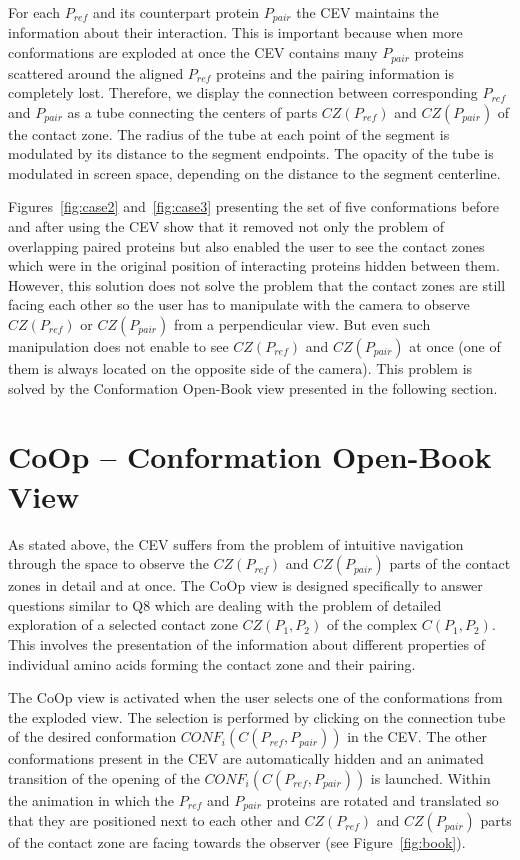\documentclass[journal]{vgtc}                %
\begin{document}
For each $P_{ref}$ and its counterpart protein $P_{pair}$ the CEV maintains the information about their interaction.
This is important because when more conformations are exploded at once the CEV contains many $P_{pair}$ proteins scattered around the aligned $P_{ref}$ proteins and the pairing information is completely lost.
Therefore, we display the connection between corresponding $P_{ref}$ and $P_{pair}$ as a tube connecting the centers of parts $CZ(P_{ref})$ and $CZ(P_{pair})$ of the contact zone.
The radius of the tube at each point of the segment is modulated by its distance to the segment endpoints.
The opacity of the tube is modulated in screen space, depending on the distance to the segment centerline.

Figures~\ref{fig:case2} and~\ref{fig:case3} presenting the set of five conformations before and after using the CEV show that it removed not only the problem of overlapping paired proteins but also enabled the user to see the contact zones which were in the original position of interacting proteins hidden between them.
However, this solution does not solve the problem that the contact zones are still facing each other so the user has to manipulate with the camera to observe $CZ(P_{ref})$ or $CZ(P_{pair})$ from a perpendicular view. 
But even such manipulation does not enable to see $CZ(P_{ref})$ and $CZ(P_{pair})$ at once (one of them is always located on the opposite side of the camera).
This problem is solved by the Conformation Open-Book view presented in the following section.

\section{CoOp -- Conformation Open-Book View}
As stated above, the CEV suffers from the problem of intuitive navigation through the space to observe the $CZ(P_{ref})$ and $CZ(P_{pair})$ parts of the contact zones in detail and at once.
The CoOp view is designed specifically to answer questions similar to Q8 which are dealing with the problem of detailed exploration of a selected contact zone $CZ(P_1,P_2)$ of the complex $C(P_1,P_2)$.
This involves the presentation of the information about different properties of individual amino acids forming the contact zone and their pairing.

The CoOp view is activated when the user selects one of the conformations from the exploded view. 
The selection is performed by clicking on the connection tube of the desired conformation $CONF_i(C(P_{ref},P_{pair}))$ in the CEV.
The other conformations present in the CEV are automatically hidden and an animated transition of the opening of the $CONF_i(C(P_{ref},P_{pair}))$ is launched.
Within the animation in which the $P_{ref}$ and $P_{pair}$ proteins are rotated and translated so that they are positioned next to each other and $CZ(P_{ref})$ and $CZ(P_{pair})$ parts of the contact zone are facing towards the observer (see Figure~\ref{fig:book}). 
\end{document}
